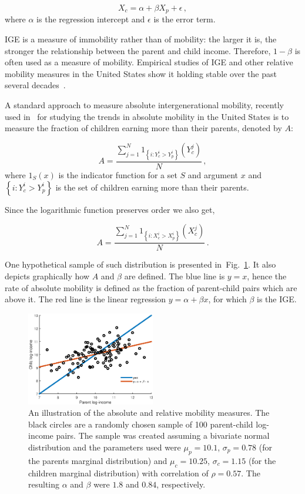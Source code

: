 \documentclass[prl,amsmath,twocolumn,nofootinbib]{revtex4}
\newcommand{\flabel}[1]{\label{fig:#1}}
\newcommand{\fref}[1]{Fig.~\ref{fig:#1}}
\newcommand{\be}{\begin{equation}}
\newcommand{\ee}{\end{equation}}
\numberwithin{equation}{section}
\begin{document}
\be
X_c = \alpha + \beta X_p + \epsilon\,,
\ee
where $\alpha$ is the regression intercept and $\epsilon$ is the error term.

IGE is a measure of immobility rather than of mobility: the larger it is, the stronger the relationship between the parent and child income. Therefore, $1-\beta$ is often used as a measure of mobility. Empirical studies of IGE and other relative mobility measures in the United States show it holding stable over the past several decades~\cite{lee2009trends,hauser2010intergenerational,chetty2014land,chetty2014united}.

A standard approach to measure absolute intergenerational mobility, recently used in~\cite{chetty2017fading} for studying the trends in absolute mobility in the United States is to measure the fraction of children earning more than their parents, denoted by $A$:

\be
A = \frac{\sum_{j=1}^{N}{1_{\left\{i:Y_c^i>Y_p^i\right\}}\left(Y_c^j\right)}}{N}\,,
\ee
where $1_S\left(x\right)$ is the indicator function for a set $S$ and argument $x$ and $\left\{i:Y_c^i>Y_p^i\right\}$ is the set of children earning more than their parents.

Since the logarithmic function preserves order we also get,

\be
A = \frac{\sum_{j=1}^{N}{1_{\left\{i:X_c^i>X_p^i\right\}}\left(X_c^j\right)}}{N}\,.
\ee

One hypothetical sample of such distribution is presented in~\fref{lines}. It also depicts graphically how $A$ and $\beta$ are defined. The blue line is $y=x$, hence the rate of  absolute mobility is defined as the fraction of parent-child pairs which are above it. The red line is the linear regression $y=\alpha +\beta x$, for which $\beta$ is the IGE.

\begin{figure}[!htb]
\centering
\includegraphics[width=0.5\textwidth]{./figs/bivariate_lines3.eps}
\caption{An illustration of the absolute and relative mobility measures. The black circles are a randomly chosen sample of 100 parent-child log-income pairs. The sample was created assuming a bivariate normal distribution and the parameters used were $\mu_p=10.1$, $\sigma_p=0.78$ (for the parents marginal distribution) and $\mu_c=10.25$, $\sigma_c=1.15$ (for the children marginal distribution) with correlation of $\rho=0.57$. The resulting $\alpha$ and $\beta$ were $1.8$ and $0.84$, respectively.}
\flabel{lines}
\end{figure}
\end{document}
